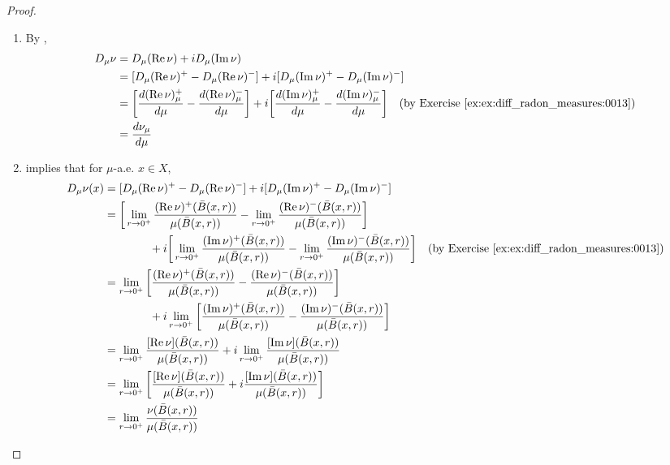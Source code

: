 \documentclass{book}
\begin{document}
	\begin{proof}\
		\begin{enumerate}
			\item By ,  
			\begin{align*}
				D_{\mu} \nu
				& = D_{\mu} (\Re \nu) + i D_{\mu} (\Im \nu) \\
				& = [D_{\mu} (\Re \nu)^+ - D_{\mu} (\Re \nu)^-] + i [D_{\mu} (\Im \nu)^+ - D_{\mu} (\Im \nu)^-] \\
				& = \bigg[ \frac{ d(\Re \nu)^+_{\mu}}{d\mu} - \frac{d (\Re \nu)^-_{\mu}}{d \mu} \bigg] + i \bigg[ \frac{d (\Im \nu)^+_{\mu}}{d \mu} - \frac{d (\Im \nu)^-_{\mu}}{d \mu} \bigg] \quad \text{(by \rex{ex:diff_radon_measures:0013})} \\
				& = \frac{d \nu_{\mu}}{d \mu}
			\end{align*}
			\item {} implies that for $\mu$-a.e. $x \in X$, 
			\begin{align*}
				D_{\mu} \nu(x)
				& = [D_{\mu} (\Re \nu)^+ - D_{\mu} (\Re \nu)^-] + i [D_{\mu} (\Im \nu)^+ - D_{\mu} (\Im \nu)^-] \\
				& = \bigg[ \lim_{r \rightarrow 0^+} \frac{ (\Re \nu)^+(\bar{B}(x, r))}{\mu(\bar{B}(x, r))} - \lim_{r \rightarrow 0^+} \frac{ (\Re \nu)^-(\bar{B}(x, r))}{\mu(\bar{B}(x, r))} \bigg] \\
				& \quad \quad \quad \quad  + i \bigg[ \lim_{r \rightarrow 0^+} \frac{ (\Im \nu)^+(\bar{B}(x, r))}{\mu(\bar{B}(x, r))} - \lim_{r \rightarrow 0^+} \frac{ (\Im \nu)^- (\bar{B}(x, r))}{\mu(\bar{B}(x, r))} \bigg] \quad \text{(by \rex{ex:diff_radon_measures:0013})} \\
				& = \lim_{r \rightarrow 0^+} \bigg[  \frac{ (\Re \nu)^+(\bar{B}(x, r))}{\mu(\bar{B}(x, r))} - \frac{ (\Re \nu)^-(\bar{B}(x, r))}{\mu(\bar{B}(x, r))} \bigg] \\
				& \quad \quad \quad \quad  + i \lim_{r \rightarrow 0^+} \bigg[  \frac{ (\Im \nu)^+(\bar{B}(x, r))}{\mu(\bar{B}(x, r))} - \frac{ (\Im \nu)^- (\bar{B}(x, r))}{\mu(\bar{B}(x, r))} \bigg] \\
				& = \lim_{r \rightarrow 0^+} \frac{ [\Re \nu](\bar{B}(x, r))}{\mu(\bar{B}(x, r))} + i \lim_{r \rightarrow 0^+} \frac{ [\Im \nu](\bar{B}(x, r))}{\mu(\bar{B}(x, r))} \\
				& = \lim_{r \rightarrow 0^+} \bigg[ \frac{ [\Re \nu](\bar{B}(x, r))}{\mu(\bar{B}(x, r))} + i \frac{ [\Im \nu](\bar{B}(x, r))}{\mu(\bar{B}(x, r))} \bigg] \\
				& = \lim_{r \rightarrow 0^+} \frac{\nu(\bar{B}(x, r))}{\mu(\bar{B}(x, r))}
			\end{align*}
		\end{enumerate}
	\end{proof}
	
\end{document}
